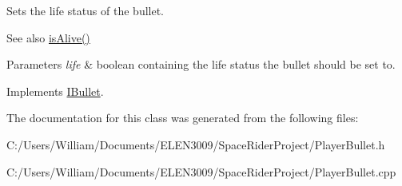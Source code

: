 Sets the life status of the bullet. 

\begin{DoxySeeAlso}{See also}
\hyperlink{class_player_bullet_ab4e6b1485e9a63ddc00effc7532a9b09}{is\+Alive()} 
\end{DoxySeeAlso}

\begin{DoxyParams}{Parameters}
{\em life} & boolean containing the life status the bullet should be set to. \\
\hline
\end{DoxyParams}


Implements \hyperlink{class_i_bullet}{I\+Bullet}.



The documentation for this class was generated from the following files\+:\begin{DoxyCompactItemize}
\item 
C\+:/\+Users/\+William/\+Documents/\+E\+L\+E\+N3009/\+Space\+Rider\+Project/Player\+Bullet.\+h\item 
C\+:/\+Users/\+William/\+Documents/\+E\+L\+E\+N3009/\+Space\+Rider\+Project/Player\+Bullet.\+cpp\end{DoxyCompactItemize}
